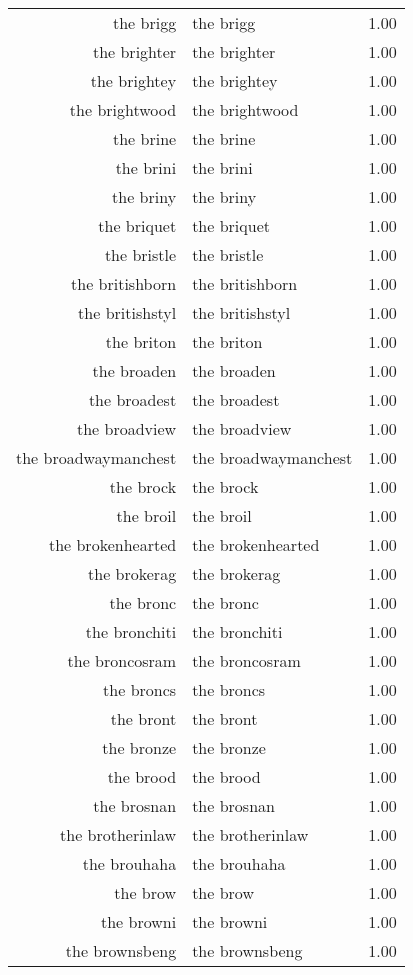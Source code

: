\begin{table}[ht]
\begin{tabular}{rlr}
  the brigg & the brigg & 1.00 \\ 
  the brighter & the brighter & 1.00 \\ 
  the brightey & the brightey & 1.00 \\ 
  the brightwood & the brightwood & 1.00 \\ 
  the brine & the brine & 1.00 \\ 
  the brini & the brini & 1.00 \\ 
  the briny & the briny & 1.00 \\ 
  the briquet & the briquet & 1.00 \\ 
  the bristle & the bristle & 1.00 \\ 
  the britishborn & the britishborn & 1.00 \\ 
  the britishstyl & the britishstyl & 1.00 \\ 
  the briton & the briton & 1.00 \\ 
  the broaden & the broaden & 1.00 \\ 
  the broadest & the broadest & 1.00 \\ 
  the broadview & the broadview & 1.00 \\ 
  the broadwaymanchest & the broadwaymanchest & 1.00 \\ 
  the brock & the brock & 1.00 \\ 
  the broil & the broil & 1.00 \\ 
  the brokenhearted & the brokenhearted & 1.00 \\ 
  the brokerag & the brokerag & 1.00 \\ 
  the bronc & the bronc & 1.00 \\ 
  the bronchiti & the bronchiti & 1.00 \\ 
  the broncosram & the broncosram & 1.00 \\ 
  the broncs & the broncs & 1.00 \\ 
  the bront & the bront & 1.00 \\ 
  the bronze & the bronze & 1.00 \\ 
  the brood & the brood & 1.00 \\ 
  the brosnan & the brosnan & 1.00 \\ 
  the brotherinlaw & the brotherinlaw & 1.00 \\ 
  the brouhaha & the brouhaha & 1.00 \\ 
  the brow & the brow & 1.00 \\ 
  the browni & the browni & 1.00 \\ 
  the brownsbeng & the brownsbeng & 1.00 \\ 

\end{tabular}
\end{table}
